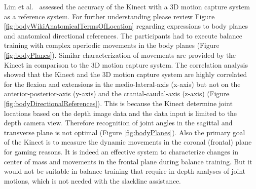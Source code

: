 Lim et al.~\cite{Lim2015-pw} assessed the accuracy of the Kinect with a 3D motion capture system as a reference system. For further understanding please review Figure \ref{fig:bodyWikiAnatomicalTermsOfLocation} regarding expressions to body planes and anatomical directional references. The participants had to execute balance training with complex aperiodic movements in the body planes (Figure \ref{fig:bodyPlanes}). Similar characterization of movements are provided by the Kinect in comparison to the 3D motion capture system. The correlation analysis showed that the Kinect and the 3D motion capture system are highly correlated for the flexion and extensions in the medio-lateral-axis (x-axis) but not on the anterior-posterior-axis (y-axis) and the cranial-caudal-axis (z-axis) (Figure \ref{fig:bodyDirectionalReferences}). This is because the Kinect determine joint locations based on the depth image data and the data input is limited to the depth camera view. Therefore recognition of joint angles in the sagittal and transverse plane is not optimal (Figure \ref{fig:bodyPlanes}). Also the primary goal of the Kinect is to measure the dynamic movements in the coronal (frontal) plane for gaming reasons. It is indeed an effective system to characterize changes in center of mass and movements in the frontal plane during balance training. But it would not be suitable in balance training that require in-depth analyses of joint motions, which is not needed with the slackline assistance.

